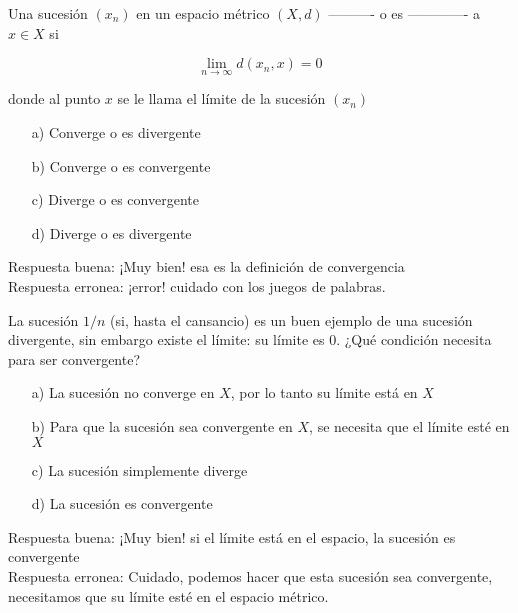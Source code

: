 \documentclass{exam}
\begin{document}
\begin{center}
\end{center}

\vspace{3mm}


\vspace{5mm}

\begin{questions}

\question Una sucesión $(x_n)$ en un espacio métrico $(X,d)$ ---------- o es ------------- a $x \in X$ si

\[\lim_{ n \to \infty} d(x_n, x) = 0\]

donde al punto $x$ se le llama el límite de la sucesión $(x_n)$

\begin{itemize}
\item[a)] Converge o es divergente
\item[b)] Converge o es convergente
\item[c)] Diverge o es convergente
\item[d)] Diverge o es divergente
\end{itemize}

Respuesta buena: ¡Muy bien! esa es la definición de convergencia\\
Respuesta erronea: ¡error!  cuidado con los juegos de palabras.

\question La sucesión $1/n$ (si, hasta el cansancio) es un buen ejemplo de una sucesión divergente, sin embargo existe el límite: su límite es $0$. ¿Qué condición necesita para ser convergente? 



\begin{itemize}
\item[a)] La sucesión no converge en $X$, por lo tanto su límite está en $X$
\item[b)] Para que la sucesión sea convergente en $X$, se necesita que el límite esté en $X$
\item[c)] La sucesión simplemente diverge
\item[d)] La sucesión es convergente
\end{itemize}

Respuesta buena: ¡Muy bien! si el límite está en el espacio, la sucesión es convergente\\
Respuesta erronea: Cuidado, podemos hacer que esta sucesión sea convergente, necesitamos que su límite esté en el espacio métrico.


\end{questions}
\end{document}
